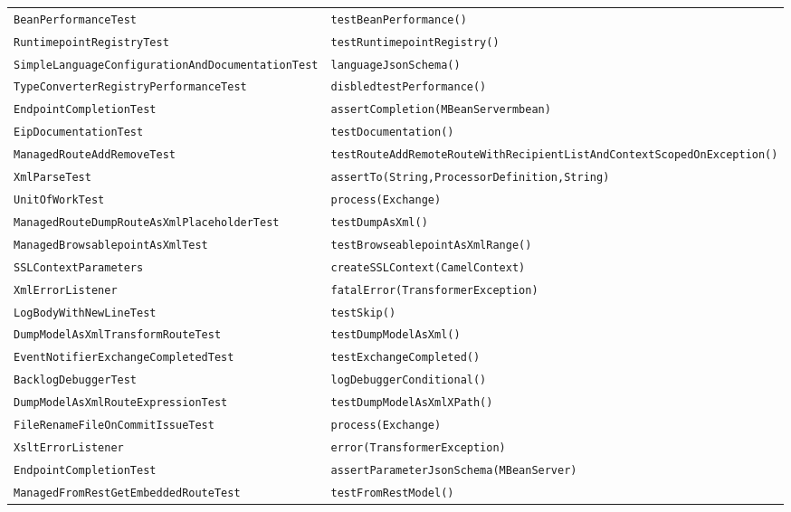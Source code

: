 \begin{center}
\begin{longtable}{ll}
\lstinline/BeanPerformanceTest/&{\lstinline/testBeanPerformance()/}\\
\lstinline/RuntimepointRegistryTest/&{\lstinline/testRuntimepointRegistry()/}\\
\lstinline/SimpleLanguageConfigurationAndDocumentationTest/&{\lstinline/languageJsonSchema()/}\\
\lstinline/TypeConverterRegistryPerformanceTest/&{\lstinline/disbledtestPerformance()/}\\
\lstinline/EndpointCompletionTest/&{\lstinline/assertCompletion(MBeanServermbean)/}\\
\lstinline/EipDocumentationTest/&{\lstinline/testDocumentation()/}\\
\lstinline/ManagedRouteAddRemoveTest/&{\lstinline/testRouteAddRemoteRouteWithRecipientListAndContextScopedOnException()/}\\
\lstinline/XmlParseTest/&{\lstinline/assertTo(String,ProcessorDefinition,String)/}\\
\lstinline/UnitOfWorkTest/&{\lstinline/process(Exchange)/}\\
\lstinline/ManagedRouteDumpRouteAsXmlPlaceholderTest/&{\lstinline/testDumpAsXml()/}\\
\lstinline/ManagedBrowsablepointAsXmlTest/&{\lstinline/testBrowseablepointAsXmlRange()/}\\
\lstinline/SSLContextParameters/&{\lstinline/createSSLContext(CamelContext)/}\\
\lstinline/XmlErrorListener/&{\lstinline/fatalError(TransformerException)/}\\
\lstinline/LogBodyWithNewLineTest/&{\lstinline/testSkip()/}\\
\lstinline/DumpModelAsXmlTransformRouteTest/&{\lstinline/testDumpModelAsXml()/}\\
\lstinline/EventNotifierExchangeCompletedTest/&{\lstinline/testExchangeCompleted()/}\\
\lstinline/BacklogDebuggerTest/&{\lstinline/logDebuggerConditional()/}\\
\lstinline/DumpModelAsXmlRouteExpressionTest/&{\lstinline/testDumpModelAsXmlXPath()/}\\
\lstinline/FileRenameFileOnCommitIssueTest/&{\lstinline/process(Exchange)/}\\
\lstinline/XsltErrorListener/&{\lstinline/error(TransformerException)/}\\
\lstinline/EndpointCompletionTest/&{\lstinline/assertParameterJsonSchema(MBeanServer)/}\\
\lstinline/ManagedFromRestGetEmbeddedRouteTest/&{\lstinline/testFromRestModel()/}\\

\end{longtable}
\end{center}
